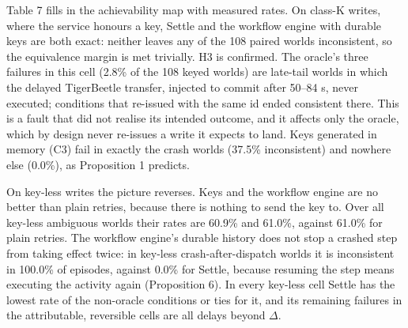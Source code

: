\documentclass[
  10pt,
]{article}
\begin{document}
Table 7 fills in the achievability map with measured rates. On class-K
writes, where the service honours a key, Settle and the workflow engine
with durable keys are both exact: neither leaves any of the 108 paired
worlds inconsistent, so the equivalence margin is met trivially. H3 is
confirmed. The oracle's three failures in this cell (2.8\% of the 108
keyed worlds) are late-tail worlds in which the delayed TigerBeetle
transfer, injected to commit after 50--84 s, never executed; conditions
that re-issued with the same id ended consistent there. This is a fault
that did not realise its intended outcome, and it affects only the
oracle, which by design never re-issues a write it expects to land. Keys
generated in memory (C3) fail in exactly the crash worlds (37.5\%
inconsistent) and nowhere else (0.0\%), as Proposition 1 predicts.

On key-less writes the picture reverses. Keys and the workflow engine
are no better than plain retries, because there is nothing to send the
key to. Over all key-less ambiguous worlds their rates are 60.9\% and
61.0\%, against 61.0\% for plain retries. The workflow engine's durable
history does not stop a crashed step from taking effect twice: in
key-less crash-after-dispatch worlds it is inconsistent in 100.0\% of
episodes, against 0.0\% for Settle, because resuming the step means
executing the activity again (Proposition 6). In every key-less cell
Settle has the lowest rate of the non-oracle conditions or ties for it,
and its remaining failures in the attributable, reversible cells are all
delays beyond \(\Delta\).
\end{document}
